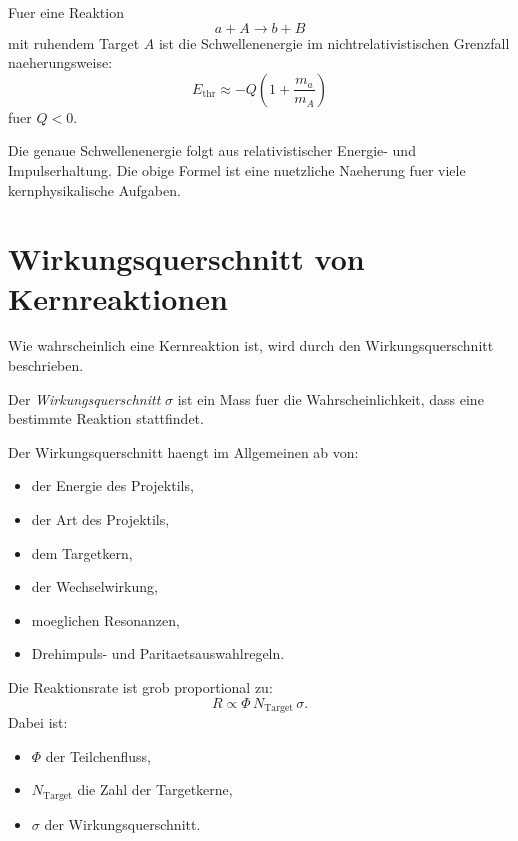 \begin{formulabox}
Fuer eine Reaktion
\[
    a + A \rightarrow b + B
\]
mit ruhendem Target $A$ ist die Schwellenenergie im nichtrelativistischen Grenzfall
naeherungsweise:
\[
    E_{\mathrm{thr}}
    \approx
    -Q
    \left(
        1+\frac{m_a}{m_A}
    \right)
\]
fuer $Q<0$.
\end{formulabox}

\begin{notebox}
Die genaue Schwellenenergie folgt aus relativistischer Energie- und Impulserhaltung.
Die obige Formel ist eine nuetzliche Naeherung fuer viele kernphysikalische Aufgaben.
\end{notebox}

\section{Wirkungsquerschnitt von Kernreaktionen}

Wie wahrscheinlich eine Kernreaktion ist, wird durch den Wirkungsquerschnitt
beschrieben.

\begin{definitionbox}
Der \emph{Wirkungsquerschnitt} $\sigma$ ist ein Mass fuer die Wahrscheinlichkeit,
dass eine bestimmte Reaktion stattfindet.
\end{definitionbox}

\begin{conceptbox}
Der Wirkungsquerschnitt haengt im Allgemeinen ab von:
\begin{itemize}
    \item der Energie des Projektils,
    \item der Art des Projektils,
    \item dem Targetkern,
    \item der Wechselwirkung,
    \item moeglichen Resonanzen,
    \item Drehimpuls- und Paritaetsauswahlregeln.
\end{itemize}
\end{conceptbox}

\begin{formulabox}
Die Reaktionsrate ist grob proportional zu:
\[
    R \propto \Phi \, N_{\mathrm{Target}} \, \sigma.
\]
Dabei ist:
\begin{itemize}
    \item $\Phi$ der Teilchenfluss,
    \item $N_{\mathrm{Target}}$ die Zahl der Targetkerne,
    \item $\sigma$ der Wirkungsquerschnitt.
\end{itemize}
\end{formulabox}

